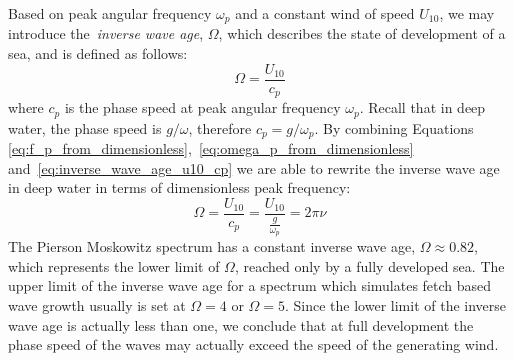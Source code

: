 Based on peak angular frequency $\omega_p$ and a constant wind of speed $U_{10}$, 
we may introduce the~\emph{inverse wave age}, $\Omega$, which describes the 
state of development of a sea, and is defined as follows:
\begin{equation}
\label{eq:inverse_wave_age_u10_cp}
 \Omega = \frac{U_{10}}{c_p}
\end{equation}
where $c_p$ is the phase speed at peak angular frequency $\omega_p$. Recall that 
in deep water, the phase speed is $g/\omega$, therefore $c_p = g/\omega_p$. By 
combining Equations 
\ref{eq:f_p_from_dimensionless},~\ref{eq:omega_p_from_dimensionless} 
and~\ref{eq:inverse_wave_age_u10_cp} we are able to rewrite the inverse wave 
age in deep water in terms of dimensionless peak frequency:
\begin{equation}
\label{eq:inverse_wave_age_deep_water}
 \Omega = \frac{U_{10}}{c_p} = \frac{U_{10}}{\frac{g}{\omega_p}} = 2\pi\nu
\end{equation}
The Pierson Moskowitz spectrum has a constant inverse wave age, $\Omega
\approx 0.82$, which represents the lower limit of $\Omega$, reached only by a 
fully developed sea. The upper limit of the inverse wave age for a spectrum 
which simulates fetch based wave growth usually is set at $\Omega = 4$ or 
$\Omega = 5$. Since the lower limit of the inverse wave age is actually less 
than one, we conclude that at full development the phase speed of the waves may 
actually exceed the speed of the generating wind.
%
